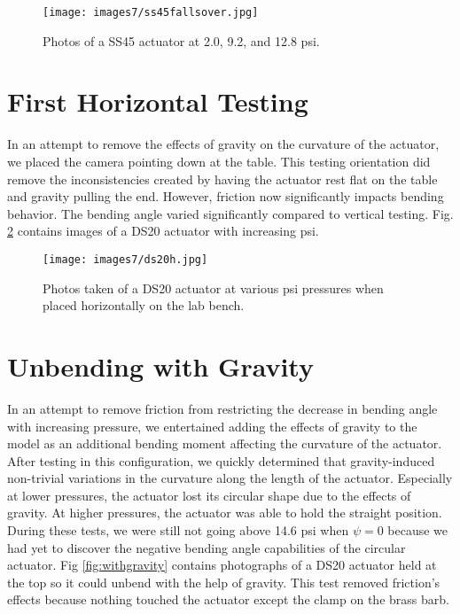 \begin{figure}[!ht]
    \centering
     \texttt{[image: images7/ss45fallsover.jpg]}
    \caption{Photos of a SS45 actuator at 2.0, 9.2, and 12.8 psi.}
    \label{fig:ss45fallsover}
\end{figure}

\clearpage
\section{First Horizontal Testing}

In an attempt to remove the effects of gravity on the curvature of the actuator, we placed the camera pointing down at the table. This testing orientation did remove the inconsistencies created by having the actuator rest flat on the table and gravity pulling the end. However, friction now significantly impacts bending behavior. The bending angle varied significantly compared to vertical testing. Fig. \ref{fig:ds20h} contains images of a DS20 actuator with increasing psi. 

\begin{figure}[!ht]
    \centering
     \texttt{[image: images7/ds20h.jpg]}
    \caption{Photos taken of a DS20 actuator at various psi pressures when placed horizontally on the lab bench.}
    \label{fig:ds20h}
\end{figure}

\clearpage
\section{Unbending with Gravity}

In an attempt to remove friction from restricting the decrease in bending angle with increasing pressure, we entertained adding the effects of gravity to the model as an additional bending moment affecting the curvature of the actuator. After testing in this configuration, we quickly determined that gravity-induced non-trivial variations in the curvature along the length of the actuator. Especially at lower pressures, the actuator lost its circular shape due to the effects of gravity. At higher pressures, the actuator was able to hold the straight position. During these tests, we were still not going above 14.6 psi when $\psi=0$ because we had yet to discover the negative bending angle capabilities of the circular actuator. Fig \ref{fig:withgravity} contains photographs of a DS20 actuator held at the top so it could unbend with the help of gravity. This test removed friction's effects because nothing touched the actuator except the clamp on the brass barb. 

